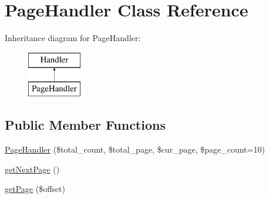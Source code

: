 \hypertarget{classPageHandler}{\section{Page\-Handler Class Reference}
\label{classPageHandler}
}
Inheritance diagram for Page\-Handler\-:\begin{figure}[H]
\begin{center}
\leavevmode
\includegraphics[height=2.000000cm]{classPageHandler}
\end{center}
\end{figure}
\subsection*{Public Member Functions}
\begin{DoxyCompactItemize}
\item 
\hyperlink{classPageHandler_a98c8fc6b290d49c3880c323b263fe7e7}{Page\-Handler} (\$total\-\_\-count, \$total\-\_\-page, \$cur\-\_\-page, \$page\-\_\-count=10)
\item 
\hyperlink{classPageHandler_a259d01838d005d854d4cc263ba524de7}{get\-Next\-Page} ()
\item 
\hyperlink{classPageHandler_a971f178609a0dd6e1a0fd07daa94782d}{get\-Page} (\$offset)
\end{DoxyCompactItemize}
